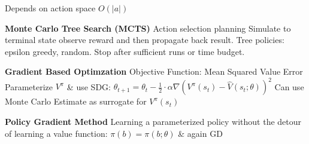 \documentclass[a4paper, 11pt, landscape]{article}
\begin{document}
\begin{multicols*}{3}
Depends on action space $O(|a|)$


\textbf{Monte Carlo Tree Search (MCTS)}
Action selection planning
Simulate to terminal state observe reward and then propagate back result. Tree policies: epsilon greedy, random. Stop after sufficient runs or time budget.

\textbf{Gradient Based Optimzation}
Objective Function: Mean Squared Value Error
Parameterize $V^\pi$ \& use SDG:
$\theta_{t+1} = \theta_{t} - \frac{1}{2}\cdot\alpha\nabla(V^\pi(s_t) - \hat{V}(s_t; \theta ))^2$
Can use Monte Carlo Estimate as surrogate for $V^\pi(s_t)$

\textbf{Policy Gradient Method}
Learning a parameterized policy without the detour of learning a value function: $\pi(b) = \pi(b;\theta)$ \& again GD

\end{multicols*}
\end{document}
